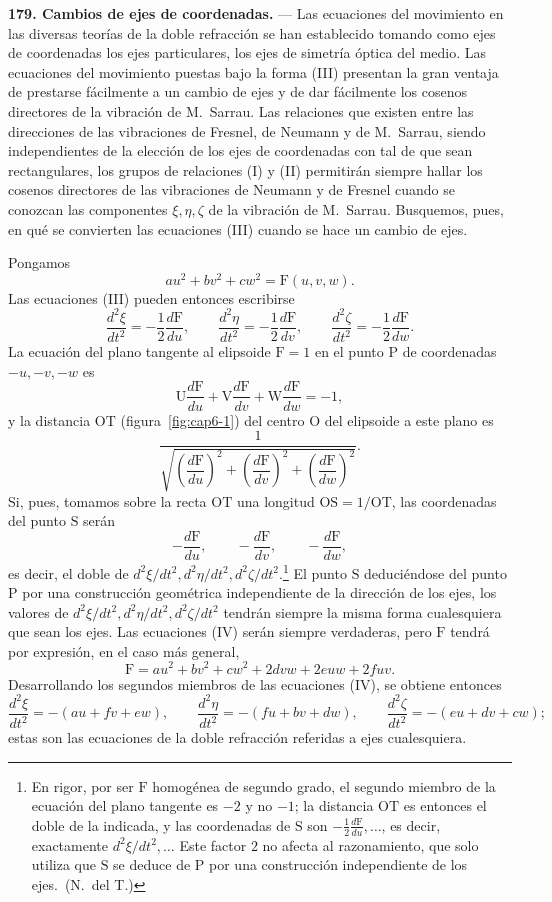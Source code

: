 \noindent\textbf{179. Cambios de ejes de coordenadas.} — Las ecuaciones
del movimiento en las diversas teorías de la doble refracción se han
establecido tomando como ejes de coordenadas los ejes particulares, los
ejes de simetría óptica del medio. Las ecuaciones del movimiento puestas
bajo la forma (III) presentan la gran ventaja de prestarse fácilmente a un
cambio de ejes y de dar fácilmente los cosenos directores de la vibración
de M.~Sarrau. Las relaciones que existen entre las direcciones de las
vibraciones de Fresnel, de Neumann y de M.~Sarrau, siendo independientes
de la elección de los ejes de coordenadas con tal de que sean
rectangulares, los grupos de relaciones (I) y (II) permitirán siempre
hallar los cosenos directores de las vibraciones de Neumann y de Fresnel
cuando se conozcan las componentes $\xi,\eta,\zeta$ de la vibración de
M.~Sarrau. Busquemos, pues, en qué se convierten las ecuaciones (III) cuando
se hace un cambio de ejes.

Pongamos
\[
au^2+bv^2+cw^2=\mathrm F(u,v,w).
\]
Las ecuaciones (III) pueden entonces escribirse
\begin{equation}
\frac{d^2\xi}{dt^2}=-\frac12\frac{d\mathrm F}{du},\qquad
\frac{d^2\eta}{dt^2}=-\frac12\frac{d\mathrm F}{dv},\qquad
\frac{d^2\zeta}{dt^2}=-\frac12\frac{d\mathrm F}{dw}.
\tag{IV}
\end{equation}
La ecuación del plano tangente al elipsoide $\mathrm F=1$ en el punto $\mathrm
P$ de coordenadas $-u,-v,-w$ es
\[
\mathrm U\frac{d\mathrm F}{du}+\mathrm V\frac{d\mathrm F}{dv}+\mathrm W\frac{d\mathrm F}{dw}=-1,
\]
y la distancia $\mathrm{OT}$ (figura~\ref{fig:cap6-1}) del centro $\mathrm
O$ del elipsoide a este plano es
\[
\frac{1}{\sqrt{\left(\dfrac{d\mathrm F}{du}\right)^2+\left(\dfrac{d\mathrm F}{dv}\right)^2+\left(\dfrac{d\mathrm F}{dw}\right)^2}}.
\]
Si, pues, tomamos sobre la recta $\mathrm{OT}$ una longitud
$\mathrm{OS}=1/\mathrm{OT}$, las coordenadas del punto $\mathrm S$ serán
\[
-\frac{d\mathrm F}{du},\qquad -\frac{d\mathrm F}{dv},\qquad -\frac{d\mathrm F}{dw},
\]
es decir, el doble de $d^2\xi/dt^2,d^2\eta/dt^2,d^2\zeta/dt^2$.\footnote{En
rigor, por ser $\mathrm F$ homogénea de segundo grado, el segundo miembro
de la ecuación del plano tangente es $-2$ y no $-1$; la distancia
$\mathrm{OT}$ es entonces el doble de la indicada, y las coordenadas de
$\mathrm S$ son $-\frac12\frac{d\mathrm F}{du},\ldots$, es decir,
exactamente $d^2\xi/dt^2,\ldots$ Este factor $2$ no afecta al
razonamiento, que solo utiliza que $\mathrm S$ se deduce de $\mathrm P$
por una construcción independiente de los ejes.~(N.~del T.)} El punto
$\mathrm S$ deduciéndose del punto $\mathrm P$ por una construcción
geométrica independiente de la dirección de los ejes, los valores de
$d^2\xi/dt^2,d^2\eta/dt^2,d^2\zeta/dt^2$ tendrán siempre la misma forma
cualesquiera que sean los ejes. Las ecuaciones (IV) serán siempre
verdaderas, pero $\mathrm F$ tendrá por expresión, en el caso más general,
\[
\mathrm F=au^2+bv^2+cw^2+2dvw+2euw+2fuv.
\]
Desarrollando los segundos miembros de las ecuaciones (IV), se obtiene
entonces
\[
\frac{d^2\xi}{dt^2}=-(au+fv+ew),\qquad
\frac{d^2\eta}{dt^2}=-(fu+bv+dw),\qquad
\frac{d^2\zeta}{dt^2}=-(eu+dv+cw);
\]
estas son las ecuaciones de la doble refracción referidas a ejes
cualesquiera.

